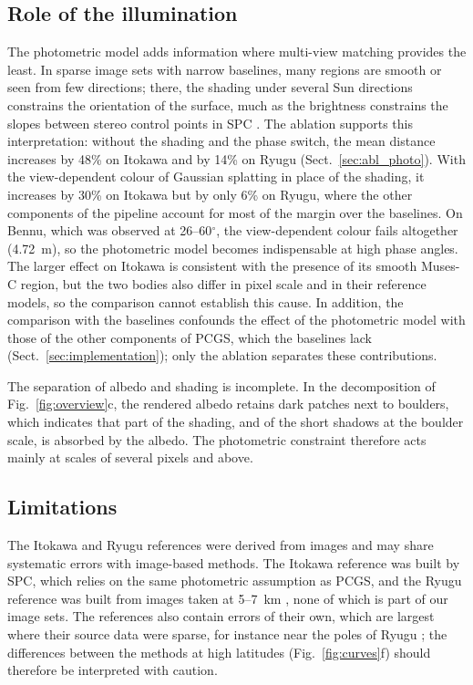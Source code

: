 \documentclass[fleqn,usenatbib]{aa}
\newcommand{\pcgs}{PCGS}
\begin{document}
\subsection{Role of the illumination}

The photometric model adds information where multi-view matching provides the least. In sparse image sets with narrow baselines, many regions are smooth or seen from few directions; there, the shading
under several Sun directions constrains the orientation of the surface, much as the brightness constrains the slopes between stereo
control points in SPC \citep{Gaskell2008}. The ablation supports this interpretation: without the shading and the phase switch, the mean distance increases by 48\% on Itokawa and by 14\% on Ryugu (Sect.~\ref{sec:abl_photo}). With the
view-dependent colour of Gaussian splatting in place of the shading, it increases by 30\% on Itokawa but by only 6\% on Ryugu, where the other components of the pipeline account for most of the margin over the baselines. On Bennu, which
was observed at 26--60$^\circ$, the view-dependent colour fails altogether (4.72~m), so the photometric model becomes
indispensable at high phase angles. The larger effect on Itokawa is consistent with the presence of its smooth Muses-C region, but the two bodies also
differ in pixel scale and in their reference models, so the comparison cannot establish this cause. In addition, the
comparison with the baselines confounds the effect of the photometric model with those of the other components of
\pcgs, which the baselines lack (Sect.~\ref{sec:implementation}); only the ablation separates these contributions.

The separation of albedo and shading is incomplete. In the decomposition of Fig.~\ref{fig:overview}c, the rendered
albedo retains dark patches next to boulders, which indicates that part of the shading, and of the short shadows at the
boulder scale, is absorbed by the albedo. The photometric constraint therefore acts mainly at scales of several pixels
and above.

\subsection{Limitations}

The Itokawa and Ryugu references were derived from images and may share systematic errors with image-based methods.
The Itokawa reference was built by SPC, which relies on the same photometric assumption as \pcgs, and the Ryugu
reference was built from images taken at 5--7~km \citep{ChenH2025}, none of which is part of our image sets. The
references also contain errors of their own, which are largest where their source data were sparse, for instance near
the poles of Ryugu \citep{ChenH2025}; the differences between the methods at high latitudes (Fig.~\ref{fig:curves}f)
should therefore be interpreted with caution.
\end{document}
